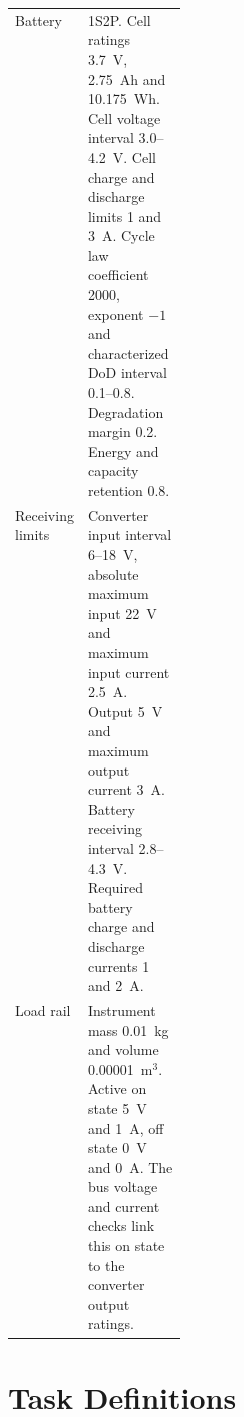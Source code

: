 {\begin{longtable}{@{}>{\raggedright\arraybackslash}p{0.20\linewidth}>{\raggedright\arraybackslash}p{}@{}}
Battery & 1S2P. Cell ratings 3.7~V, 2.75~Ah and 10.175~Wh. Cell voltage interval 3.0--4.2~V. Cell charge and discharge limits 1 and 3~A. Cycle law coefficient 2000, exponent $-1$ and characterized DoD interval 0.1--0.8. Degradation margin 0.2. Energy and capacity retention 0.8. \\
Receiving limits & Converter input interval 6--18~V, absolute maximum input 22~V and maximum input current 2.5~A. Output 5~V and maximum output current 3~A. Battery receiving interval 2.8--4.3~V. Required battery charge and discharge currents 1 and 2~A. \\
Load rail & Instrument mass 0.01~kg and volume 0.00001~m$^3$. Active on state 5~V and 1~A, off state 0~V and 0~A. The bus voltage and current checks link this on state to the converter output ratings. \\
\end{longtable}}

\section{Task Definitions}

